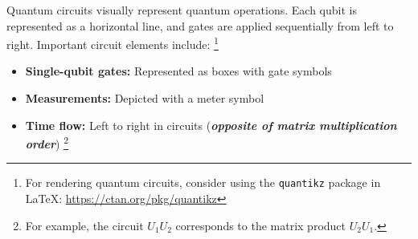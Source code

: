 Quantum circuits visually represent quantum operations. Each qubit is
represented as a horizontal line, and gates are applied sequentially from
left to right. Important circuit elements include: \footnote{For rendering
quantum circuits, consider using the \texttt{quantikz} package in \LaTeX:
\url{https://ctan.org/pkg/quantikz}}

\begin{itemize}

  \item \textbf{Single-qubit gates:} Represented as boxes with gate symbols

  \item \textbf{Measurements:} Depicted with a meter symbol

  \item \textbf{Time flow:} Left to right in circuits (\textit{\textbf{opposite
    of matrix multiplication order}}) \footnote {
      For example, the circuit $U_1U_2$ corresponds to the
      matrix product $U_2U_1$.
  }

\end{itemize}


